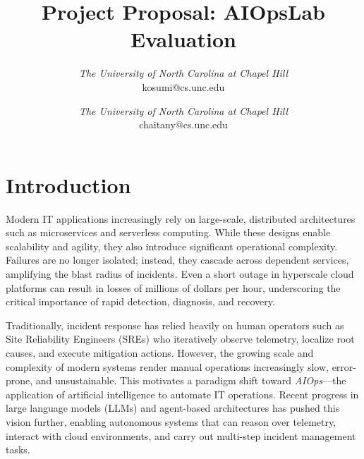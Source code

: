 \documentclass[conference]{IEEEtran}
\begin{document}
\title{Project Proposal: AIOpsLab Evaluation}
\author{
\textit{The University of North Carolina at
Chapel Hill}\\
kosumi@cs.unc.edu
\and
{}
\textit{The University of North Carolina at
Chapel Hill}\\
chaitany@cs.unc.edu}

\maketitle



\section{Introduction}

Modern IT applications increasingly rely on large-scale, distributed architectures such as microservices and serverless computing. While these designs enable scalability and agility, they also introduce significant operational complexity. Failures are no longer isolated; instead, they cascade across dependent services, amplifying the blast radius of incidents. Even a short outage in hyperscale cloud platforms can result in losses of millions of dollars per hour, underscoring the critical importance of rapid detection, diagnosis, and recovery.

Traditionally, incident response has relied heavily on human operators such as Site Reliability Engineers (SREs) who iteratively observe telemetry, localize root causes, and execute mitigation actions. However, the growing scale and complexity of modern systems render manual operations increasingly slow, error-prone, and unsustainable. This motivates a paradigm shift toward \textit{AIOps}---the application of artificial intelligence to automate IT operations. Recent progress in large language models (LLMs) and agent-based architectures has pushed this vision further, enabling autonomous systems that can reason over telemetry, interact with cloud environments, and carry out multi-step incident management tasks.
\end{document}
